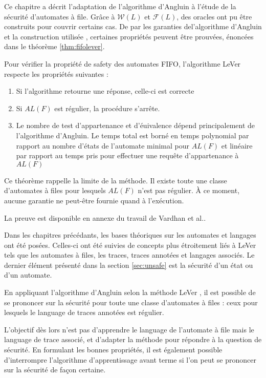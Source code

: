 Ce chapitre a décrit l'adaptation de l'algorithme d'Angluin à l'étude de la sécurité d'automates à file. Grâce à $\mathcal{W}(L)$ et $\mathcal{F}(L)$, des oracles ont pu être construits pour couvrir certains cas. De par les garanties del'algorithme d'Angluin\cite{Angluin87} et la construction utilisée \cite{Vardhan04}, certaines propriétés peuvent être prouvées, énoncées dans le théorème \ref{thm:fifolever}.

\begin{theorem}\label{thm:fifolever}
  Pour vérifier la propriété de safety des automates FIFO, l'algorithme LeVer respecte les propriétés suivantes :
  \begin{enumerate}
    \item Si l'algorithme retourne une réponse, celle-ci est correcte
    \item Si $AL(F)$ est régulier, la procédure s'arrête.
    \item Le nombre de test d'appartenance et d'éuivalence dépend principalement de l'algorithme d'Angluin. Le temps total est borné en temps polynomial par rapport au nombre d'états de l'automate minimal pour $AL(F)$ et linéaire par rapport au temps pris pour effectuer une requête d'appartenance à $AL(F)$
  \end{enumerate}
\end{theorem}

Ce théorème rappelle la limite de la méthode. Il existe toute une classe d'automates à files pour lesquels $AL(F)$ n'est pas régulier. À ce moment, aucune garantie ne peut-être fournie quand à l'exécution.

La preuve est disponible en annexe du travail de Vardhan et al.\cite{Vardhan04}.


Dans les chapitres précédants, les bases théoriques sur les automates et langages ont été posées. Celles-ci ont été suivies de concepts plus étroitement liés à LeVer tels que les automates à files, les traces, traces annotées et langages associés. Le dernier élément présenté dans la section \ref{sec:unsafe} est la sécurité d'un état ou d'un automate.

En appliquant l'algorithme d'Angluin \cite{Angluin87} selon la méthode LeVer \cite{Vardhan04}, il est possible de se prononcer sur la sécurité pour toute une classe d'automates à files : ceux pour lesquels le language de traces annotées est régulier.

L'objectif dès lors n'est pas d'apprendre le language de l'automate à file mais le language de trace associé, et d'adapter la méthode pour répondre à la question de sécurité. En formulant les bonnes propriétés, il est également possible d'interrompre l'algorithme d'apprentissage avant terme si l'on peut se prononcer sur la sécurité de façon certaine.


